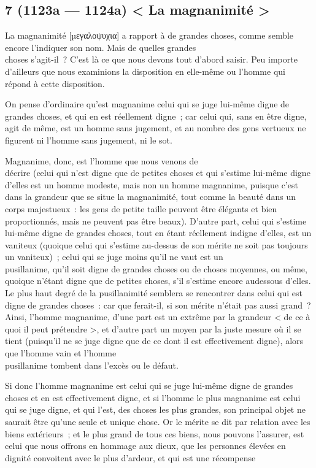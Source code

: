\documentclass[french,twoside]{book} %
\begin{document}
\subsection[{7 (1123a — 1124a) < La magnanimité >}]{7 (1123a — 1124a) < La magnanimité >}
\noindent La magnanimité [µεγαλοψυχια] a rapport à de grandes choses, comme semble encore l’indiquer son nom. Mais de quelles grandes \\
choses s’agit-il ? C’est là ce que nous devons tout d’abord  saisir. Peu importe d’ailleurs que nous examinions la disposition en elle-même ou l’homme qui répond à cette disposition.\par
On pense d’ordinaire qu’est magnanime celui qui se juge lui-même digne de grandes choses, et qui en est réellement digne ; car celui qui, sans en être digne, agit de même, est un homme sans jugement, et au nombre des gens vertueux ne figurent ni l’homme sans jugement, ni le sot.\par
Magnanime, donc, est l’homme que nous venons de \\
décrire (celui qui n’est digne que de petites choses et qui s’estime lui-même digne d’elles est un homme modeste, mais non un homme magnanime, puisque c’est dans la grandeur que se situe la magnanimité, tout comme la beauté dans un corps majestueux : les gens de petite taille peuvent être élégants et bien proportionnés, mais ne peuvent pas être beaux). D’autre part, celui qui s’estime lui-même digne de grandes choses, tout en étant réellement indigne d’elles, est un vaniteux (quoique celui qui s’estime au-dessus de son mérite ne soit pas toujours un vaniteux) ; celui qui se juge moins qu’il ne vaut est un \\
pusillanime, qu’il soit digne de grandes choses ou de choses moyennes, ou même, quoique n’étant digne que de petites choses, s’il s’estime encore audessous d’elles. Le plus haut degré de la pusillanimité semblera se rencontrer dans celui qui est digne de grandes choses : car que ferait-il, si son mérite n’était pas aussi grand ? Ainsi, l’homme magnanime, d’une part est un extrême par la grandeur < de ce à quoi il peut prétendre >, et d’autre part un moyen par la juste mesure où il se tient (puisqu’il ne se juge digne que de ce dont il est effectivement digne), alors que l’homme vain et l’homme \\
pusillanime tombent dans l’excès ou le défaut.\par
Si donc l’homme magnanime est celui qui se juge lui-même digne de grandes choses et en est effectivement digne, et si l’homme le plus magnanime est celui qui se juge digne, et qui l’est, des choses les plus grandes, son principal objet ne saurait être qu’une seule et unique chose. Or le mérite se dit par relation avec les biens extérieurs ; et le plus grand de tous ces biens, nous pouvons l’assurer, est celui que nous offrons en hommage aux dieux, que les personnes élevées en dignité convoitent avec le plus d’ardeur, et qui est une récompense \\
\end{document}
